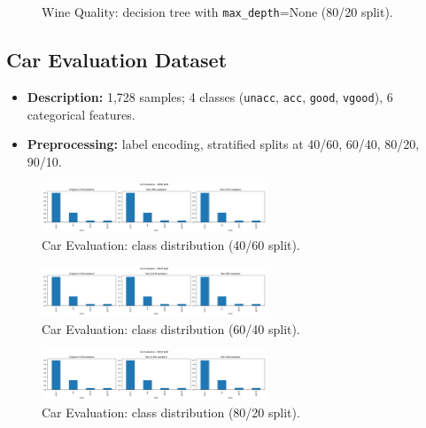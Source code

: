 \begin{figure}[H]
	\centering
	\caption{Wine Quality: decision tree with \texttt{max\_depth}=None (80/20 split).}
	\label{fig:wq-dt-depth-none}
\end{figure}

\clearpage

\subsection{Car Evaluation Dataset}
\begin{itemize}
	\item \textbf{Description:} 1,728 samples; 4 classes (\texttt{unacc}, \texttt{acc}, \texttt{good}, \texttt{vgood}), 6 categorical features.
	\item \textbf{Preprocessing:} label encoding, stratified splits at 40/60, 60/40, 80/20, 90/10.
\end{itemize}

\begin{figure}[H]
	\centering
	\includegraphics[width=0.6\textwidth]{imgs/class_dist/class_dist__car_evaluation__40_vs_60.png}
	\caption{Car Evaluation: class distribution (40/60 split).}
	\label{fig:ce-cd-40-60}
\end{figure}

\begin{figure}[H]
	\centering
	\includegraphics[width=0.6\textwidth]{imgs/class_dist/class_dist__car_evaluation__60_vs_40.png}
	\caption{Car Evaluation: class distribution (60/40 split).}
	\label{fig:ce-cd-60-40}
\end{figure}

\begin{figure}[H]
	\centering
	\includegraphics[width=0.6\textwidth]{imgs/class_dist/class_dist__car_evaluation__80_vs_20.png}
	\caption{Car Evaluation: class distribution (80/20 split).}
	\label{fig:ce-cd-80-20}
\end{figure}

